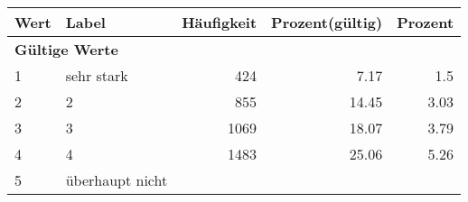      \begin{longtable}{lXrrr}
     \toprule
     \textbf{Wert} & \textbf{Label} & \textbf{Häufigkeit} & \textbf{Prozent(gültig)} & \textbf{Prozent} \\
     \endhead
     \midrule
     \multicolumn{5}{l}{\textbf{Gültige Werte}}\\

     1 &
     \multicolumn{1}{X}{ sehr stark   } &


       \num{424} &
       \num[round-mode=places,round-precision=2]{7.17} &
         \num[round-mode=places,round-precision=2]{1.5} \\

     2 &
     \multicolumn{1}{X}{ 2   } &


       \num{855} &
       \num[round-mode=places,round-precision=2]{14.45} &
         \num[round-mode=places,round-precision=2]{3.03} \\

     3 &
     \multicolumn{1}{X}{ 3   } &


       \num{1069} &
       \num[round-mode=places,round-precision=2]{18.07} &
         \num[round-mode=places,round-precision=2]{3.79} \\

     4 &
     \multicolumn{1}{X}{ 4   } &


       \num{1483} &
       \num[round-mode=places,round-precision=2]{25.06} &
         \num[round-mode=places,round-precision=2]{5.26} \\

     5 &
     \multicolumn{1}{X}{ überhaupt nicht   } &



\end{longtable}

